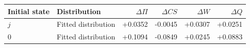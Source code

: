 \begin{tabular}{llrrrr}\toprule
Initial state & Distribution & $\Delta\Pi$ & $\Delta CS$ & $\Delta W$ & $\Delta Q$\\\midrule
$j$ & Fitted distribution & +0.0352 & -0.0045 & +0.0307 & +0.0251 \\
$0$ & Fitted distribution & +0.1094 & -0.0849 & +0.0245 & +0.0883 \\
\bottomrule\end{tabular}
